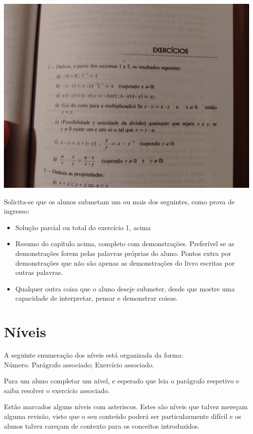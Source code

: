 \documentclass{article}
\begin{document}
	\includegraphics[width=\linewidth]{ex1}
	\newpage
	
	Solicita-se que os alunos submetam um ou mais dos seguintes, como prova de ingresso:
	
	\begin{itemize}
	\item Solução parcial ou total do exercício 1, acima
	
	\item Resumo do capítulo acima, completo com demonstrações. Preferível se as demonstrações forem pelas palavras próprias do aluno. Pontos extra por demonstrações que não são apenas as demonstrações do livro escritas por outras palavras.
	
	\item Qualquer outra coisa que o aluno deseje submeter, desde que mostre uma capacidade de interpretar, pensar e demonstrar coisas.
	\end{itemize}
	
	\section{Níveis}
	
	A seguinte enumeração dos níveis está organizada da forma:\\
	Número. Parágrafo associado; Exercício associado.
	
	Para um aluno completar um nível, e esperado que leia o parágrafo respetivo e saiba resolver o exercício associado.
	
	Estão marcados alguns níveis com asteriscos. Estes são níveis que talvez mereçam alguma revisão, visto que o seu conteúdo poderá ser particularmente difícil e os alunos talvez careçam de contexto para os conceitos introduzidos.
	
\end{document}
